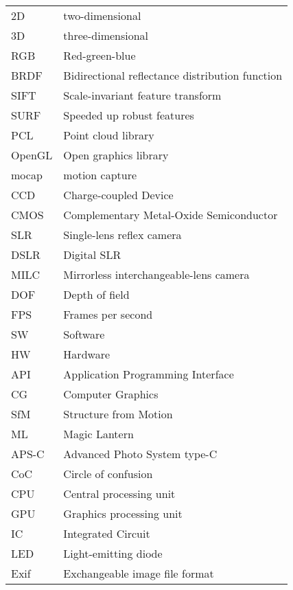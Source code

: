 \begin{tabular}{ll}
	2D & two-dimensional\\
	3D & three-dimensional\\
	RGB & Red-green-blue\\
	BRDF & Bidirectional reflectance distribution function\\
	SIFT & Scale-invariant feature transform\\
	SURF & Speeded up robust features \\
	PCL & Point cloud library\\
	OpenGL & Open graphics library\\
	mocap & motion capture\\
	CCD & Charge-coupled Device\\
	CMOS & Complementary Metal-Oxide Semiconductor\\
	SLR & Single-lens reflex camera\\
	DSLR & Digital SLR\\
	MILC & Mirrorless interchangeable-lens camera\\
	DOF & Depth of field\\
	FPS & Frames per second\\
	SW & Software\\
	HW & Hardware\\
	API & Application Programming Interface\\
	CG & Computer Graphics\\
	SfM & Structure from Motion\\
	ML & Magic Lantern\\
	APS-C & Advanced Photo System type-C\\
	CoC & Circle of confusion\\
	CPU & Central processing unit\\
	GPU & Graphics processing unit\\
	IC & Integrated Circuit\\
	LED & Light-emitting diode\\
	Exif & Exchangeable image file format\\
\end{tabular}

